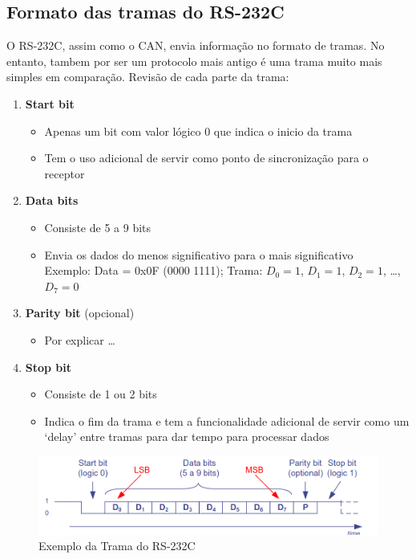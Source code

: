 \documentclass[a4paper, 12pt, onecolumn, oneside]{scrartcl}
\begin{document}
\subsection{Formato das tramas do RS-232C}
O RS-232C, assim como o CAN, envia informação no formato de tramas. No entanto, tambem por ser um protocolo mais antigo
é uma trama muito mais simples em comparação.
Revisão de cada parte da trama:
\begin{enumerate}
    \item \textbf{Start bit}
    \begin{itemize}
        \item Apenas um bit com valor lógico 0 que indica o inicio da trama
        \item Tem o uso adicional de servir como ponto de sincronização para o receptor 
    \end{itemize}
    \item \textbf{Data bits}
    \begin{itemize}
        \item Consiste de 5 a 9 bits
        \item Envia os dados do menos significativo para o mais significativo\\
        Exemplo: Data = 0x0F (0000 1111); Trama: \(D_0 = 1\), \(D_1 = 1\), \(D_2 = 1\), \dots, \(D_7 = 0\)
    \end{itemize}
    \item \textbf{Parity bit} (opcional)
    \begin{itemize}
        \item Por explicar \dots
    \end{itemize}
    \item \textbf{Stop bit}
    \begin{itemize}
        \item Consiste de 1 ou 2 bits
        \item Indica o fim da trama e tem a funcionalidade adicional de servir como um `delay' entre tramas para dar tempo para processar dados
    \end{itemize}
\end{enumerate}

\begin{figure}[H]
    \centering
    \includegraphics[width=1\textwidth]{Trama-exemplo_RS-232C.png}
    \caption{Exemplo da Trama do RS-232C}\label{fig7}
\end{figure}
\end{document}
